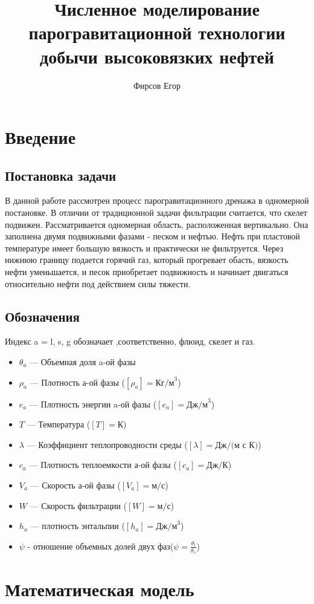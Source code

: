 \documentclass[12pt,a4paper]{article}
\title{Численное моделирование парогравитационной технологии добычи высоковязких нефтей}
\author{Фирсов Егор}
\begin{document}
\newpage
\tableofcontents
\newpage
\section{Введение}
\subsection{Постановка задачи}
В данной работе рассмотрен процесс парогравитационного дренажа в одномерной постановке. В отличии от традиционной задачи фильтрации считается, что скелет подвижен. Рассматривается одномерная область, расположенная вертикально. Она заполнена двумя подвижными фазами - песком и нефтью. Нефть при пластовой температуре имеет большую вязкость и практически не фильтруется. Через нижнюю границу подается горячий газ, который прогревает обасть, вязкость нефти уменьшается, и песок приобретает подвижность и начинает двигаться относительно нефти под действием силы тяжести.

\subsection{Обозначения}
Индекс a  = l, s, g обозначает ,соответственно, флюид, скелет и газ.
\begin{itemize}
\item $\theta_a $ --- Объемная доля a-ой фазы
\item $\rho_a$ --- Плотность а-ой фазы ($[\rho_a] = \text{Кг/м}^3$)
\item $e_a$ --- Плотность энергии a-ой фазы ($[e_a] = \text{Дж/м}^3$)
\item $T $ --- Температура ($[T] =\text{К}$)
\item $\lambda$ --- Коэффициент теплопроводности среды ($[\lambda] = \text{Дж/(м с К)}$)
\item $c_a$ --- Плотность теплоемкости а-ой фазы ($[c_a] = \text{Дж/К}$)
\item $V_a$ --- Скорость а-ой фазы ($[V_a] = \text{м/с} $)
\item $W$ --- Скорость фильтрации ($[W] = \text{м/с} $)
\item $h_a$ --- плотность энтальпии ($[h_a] = \text{Дж/м}^3$)
\item $\psi$ - отношение объемных долей двух фаз($\psi = \frac{\theta_l}{\theta_s} $)
\end{itemize}
\section{Математическая модель}
\end{document}
